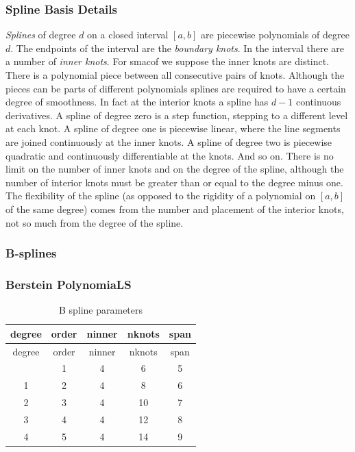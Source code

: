 \documentclass[
  12pt,
]{article}
\begin{document}
\subsubsection{Spline Basis Details}\label{spline-basis-details}

\emph{Splines} of degree \(d\) on a closed interval \([a,b]\) are piecewise polynomials of degree \(d\). The endpoints of the interval are the \emph{boundary knots}. In the interval there are a number of \emph{inner knots}. For smacof we suppose the inner knots are distinct. There is a polynomial piece between all consecutive
pairs of knots. Although the pieces can be parts of different polynomials
splines are required to have a certain degree of smoothness. In fact
at the interior knots a spline has \(d - 1\) continuous derivatives. A
spline of degree zero is a step function, stepping to a different level
at each knot. A spline of degree one is piecewise linear, where the
line segments are joined continuously at the inner knots. A spline of
degree two is piecewise quadratic and continuously differentiable at the
knots. And so on. There is no limit on the number of inner knots and
on the degree of the spline, although the number of interior knots
must be greater than or equal to the degree minus one. The flexibility
of the spline (as opposed to the rigidity of a polynomial on \([a,b]\)
of the same degree) comes from the number and placement of the interior knots, not so much from the degree of the spline.

\subsubsection{B-splines}\label{b-splines}

\subsubsection{Berstein PolynomiaLS}\label{berstein-polynomials}

\begin{longtable}[]{@{}ccccc@{}}
\caption{\label{tab:bsplinekable}B spline parameters}\tabularnewline
\toprule\noalign{}
degree & order & ninner & nknots & span \\
\midrule\noalign{}
\endfirsthead
\toprule\noalign{}
degree & order & ninner & nknots & span \\
\midrule\noalign{}
\endhead
\bottomrule\noalign{}
\endlastfoot
0 & 1 & 4 & 6 & 5 \\
1 & 2 & 4 & 8 & 6 \\
2 & 3 & 4 & 10 & 7 \\
3 & 4 & 4 & 12 & 8 \\
4 & 5 & 4 & 14 & 9 \\
\end{longtable}
\end{document}
